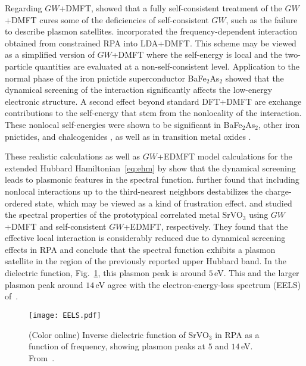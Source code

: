 \documentclass[rmp,aps,reprint,amsmath,amssymb,superscriptaddress,showpacs,nofootinbib]{revtex4-1}
\begin{document}
Regarding $GW$+DMFT,  showed that a fully self-consistent treatment of the $GW$+DMFT cures some of the deficiencies of self-consistent $GW$, such as the failure to describe plasmon satellites.  incorporated the frequency-dependent interaction obtained from constrained RPA into LDA+DMFT. This scheme may be viewed as a simplified version of $GW$+DMFT where the self-energy is local and the two-particle quantities are evaluated at a non-self-consistent level. Application to the normal phase of the iron pnictide superconductor BaFe$_{2}$As$_{2}$ showed that the  dynamical screening of the interaction significantly affects the low-energy electronic structure. A second effect beyond standard DFT+DMFT are exchange contributions to the self-energy that stem from the nonlocality of the interaction. These nonlocal self-energies were shown to be significant in BaFe$_2$As$_2$, other iron pnictides, and chalcogenides \cite{jmt_pnict}, as well as in transition metal oxides \cite{Miyake13,Tomczak2012}.

These realistic calculations as well as $GW$+EDMFT model calculations for the extended Hubbard Hamiltonian~\eqref{eq:ehm} by  show that the dynamical screening leads to plasmonic features in the spectral function.  further found that including nonlocal interactions up to the third-nearest neighbors destabilizes the charge-ordered state, which may be viewed as a kind of frustration effect.  and  studied the spectral properties of the prototypical correlated metal SrVO$_{3}$ using $GW$+DMFT and self-consistent  $GW$+EDMFT, respectively.  They found that the effective local interaction is considerably reduced due to dynamical screening effects in RPA and conclude that the spectral function exhibits a plasmon satellite in the region of the previously reported upper Hubbard band. In the dielectric function, Fig.~\ref{fig:SVOplasmons}, this plasmon peak is around $5\,$eV. This and the larger plasmon peak around $14\,$eV agree with the electron-energy-loss spectrum (EELS) of~.

\begin{figure}[tb]
\begin{center}
  \texttt{[image: EELS.pdf]}  
    \caption{(Color online) Inverse dielectric function of SrVO$_{3}$ in RPA as a function of frequency, showing  plasmon peaks at  $5$  and $14\,$eV. From~.}
  \label{fig:SVOplasmons}
\end{center}
\end{figure}
\end{document}
